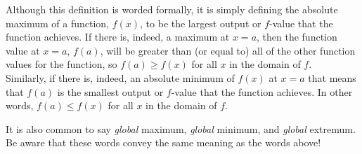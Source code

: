 \documentclass{ximera}
\begin{document}
\begin{explanation}
Although this definition is worded formally, it is simply defining the absolute maximum of a function, $f(x)$, to be the largest output or $f$-value that the function achieves.  If there is, indeed, a maximum at $x=a$, then the function value at $x=a$, $f(a)$, will be greater than (or equal to) all of the other function values for the function, so $f(a) \geq f(x)$ for all $x$ in the domain of $f$.  \\

Similarly, if there is, indeed, an absolute minimum of $f(x)$ at $x=a$ that means that $f(a)$ is the smallest output or $f$-value that the function achieves.  In other words, $f(a) \leq f(x)$ for all $x$ in the domain of $f$. \\
\end{explanation}

\begin{warning}
It is also common to say \textit{global} maximum, \textit{global} minimum, and \textit{global} extremum.  Be aware that these words convey the same meaning as the words above! 
\end{warning}
\end{document}
